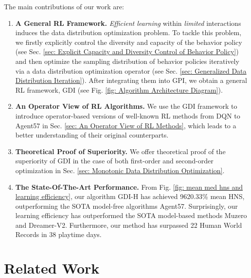 \documentclass[nohyperref]{article}
\def\GDIHmeanhns{9620.33}
\theoremstyle{plain}
\begin{document}
The main contributions of our work are: 
\begin{enumerate}
    \item \textbf{A General RL Framework.} \emph{Efficient learning}  within \emph{limited} interactions induces the data distribution optimization problem. To tackle this problem, we firstly explicitly  control the diversity and capacity of the behavior policy (see Sec. \ref{sec: Explicit  Capacity and Diversity  Control of Behavior Policy}) and  then optimize the sampling distribution of behavior policies iteratively via a data distribution optimization operator (see Sec. \ref{sec: Generalized Data Distribution Iteration}). After integrating  them into GPI, we obtain a general RL framework, GDI (see Fig. \ref{fig: Algorithm Architecture Diagram}).
    
    \item \textbf{An Operator View of RL Algorithms.} We use the GDI framework to introduce operator-based versions of well-known RL methods from DQN to Agent57 in Sec. \ref{sec: An Operator View of RL Methods}, which leads to a better understanding of their original counterparts.

    \item \textbf{Theoretical Proof of Superiority.}  We offer theoretical proof of the superiority of GDI in the case of both first-order and second-order optimization in Sec. \ref{sec: Monotonic Data Distribution Optimization}.

    \item \textbf{The State-Of-The-Art Performance.} From Fig. \ref{fig: mean med hns and learning efficiency}, our algorithm GDI-H has achieved \GDIHmeanhns\% mean HNS, outperforming the SOTA model-free algorithms Agent57. Surprisingly, our learning efficiency has outperformed the SOTA model-based methods Muzero and Dreamer-V2. Furthermore, our method has surpassed 22 Human World Records in 38 playtime days.
\end{enumerate}




\section{ Related Work}
\label{sec:Problem Formulation and Related Work}
\end{document}
